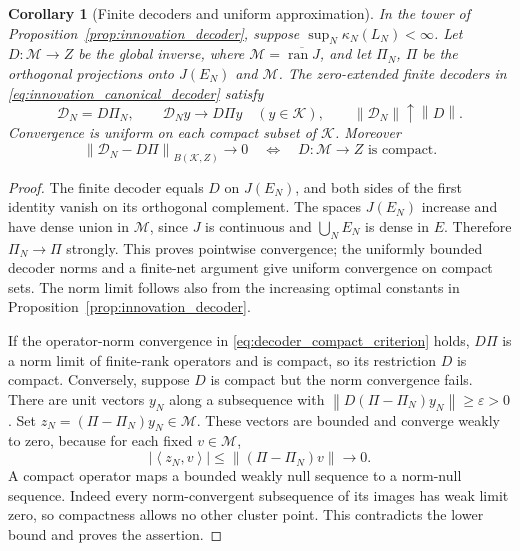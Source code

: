 \documentclass[11pt,a4paper]{amsart}
\numberwithin{equation}{section}
\newtheorem{corollary}[theorem]{Corollary}
\theoremstyle{definition}
\theoremstyle{remark}
\DeclareMathOperator{\ran}{ran}
\newcommand{\norm}[1]{\left\lVert#1\right\rVert}
\newcommand{\ip}[2]{\left\langle#1,#2\right\rangle}
\begin{document}
\begin{corollary}[Finite decoders and uniform approximation]\label{cor:decoder_convergence}
In the tower of Proposition~\ref{prop:innovation_decoder}, suppose $\sup_N\kappa_N(L_N)<\infty$. Let $D:\mathcal M\to Z$ be the global inverse, where $\mathcal M=\overline{\ran J}$, and let $\Pi_N$, $\Pi$ be the orthogonal projections onto $J(E_N)$ and $\mathcal M$. The zero-extended finite decoders in \eqref{eq:innovation_canonical_decoder} satisfy
\begin{equation}\label{eq:decoder_projection_identity}
 \mathscr D_N=D\Pi_N,\qquad
 \mathscr D_Ny\longrightarrow D\Pi y\quad(y\in\mathcal K),\qquad
 \norm{\mathscr D_N}\uparrow\norm D.
\end{equation}
Convergence is uniform on each compact subset of $\mathcal K$. Moreover
\begin{equation}\label{eq:decoder_compact_criterion}
 \norm{\mathscr D_N-D\Pi}_{B(\mathcal K,Z)}\longrightarrow0
 \quad\Longleftrightarrow\quad D:\mathcal M\to Z\text{ is compact}.
\end{equation}
\end{corollary}
\begin{proof}
The finite decoder equals $D$ on $J(E_N)$, and both sides of the first identity vanish on its orthogonal complement. The spaces $J(E_N)$ increase and have dense union in $\mathcal M$, since $J$ is continuous and $\bigcup_NE_N$ is dense in $E$. Therefore $\Pi_N\to\Pi$ strongly. This proves pointwise convergence; the uniformly bounded decoder norms and a finite-net argument give uniform convergence on compact sets. The norm limit follows also from the increasing optimal constants in Proposition~\ref{prop:innovation_decoder}.

If the operator-norm convergence in \eqref{eq:decoder_compact_criterion} holds, $D\Pi$ is a norm limit of finite-rank operators and is compact, so its restriction $D$ is compact. Conversely, suppose $D$ is compact but the norm convergence fails. There are unit vectors $y_N$ along a subsequence with $\norm{D(\Pi-\Pi_N)y_N}\ge\varepsilon>0$. Set $z_N=(\Pi-\Pi_N)y_N\in\mathcal M$. These vectors are bounded and converge weakly to zero, because for each fixed $v\in\mathcal M$,
\[
 |\ip{z_N}v|\le\norm{(\Pi-\Pi_N)v}\longrightarrow0.
\]
A compact operator maps a bounded weakly null sequence to a norm-null sequence. Indeed every norm-convergent subsequence of its images has weak limit zero, so compactness allows no other cluster point. This contradicts the lower bound and proves the assertion.
\end{proof}
\end{document}
